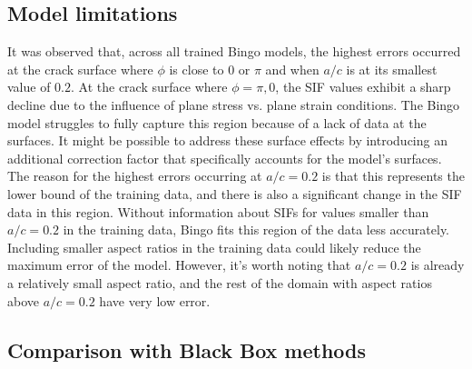 \subsection{Model limitations}

It was observed that, across all trained Bingo models, the highest errors occurred at the crack surface where $\phi$ is close to $0$ or $\pi$ and when $a/c$ is at its smallest value of $0.2$. At the crack surface where $\phi = \pi, 0$, the SIF values exhibit a sharp decline due to the influence of plane stress vs. plane strain conditions. The Bingo model struggles to fully capture this region because of a lack of data at the surfaces. It might be possible to address these surface effects by introducing an additional correction factor that specifically accounts for the model's surfaces. The reason for the highest errors occurring at $a/c = 0.2$ is that this represents the lower bound of the training data, and there is also a significant change in the SIF data in this region. Without information about SIFs for values smaller than $a/c = 0.2$ in the training data, Bingo fits this region of the data less accurately. Including smaller aspect ratios in the training data could likely reduce the maximum error of the model. However, it's worth noting that $a/c = 0.2$ is already a relatively small aspect ratio, and the rest of the domain with aspect ratios above $a/c = 0.2$ have very low error.


\subsection{Comparison with Black Box methods}



